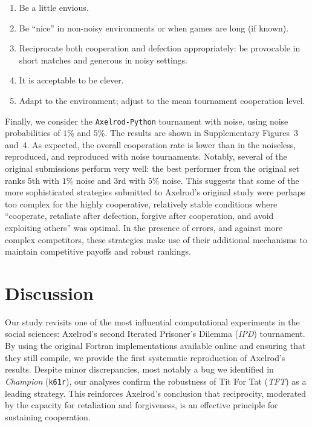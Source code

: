 \documentclass{article}
\newcommand{\TFT}{\emph{TFT}}
\newcommand{\IPD}{\emph{IPD}}
\newcommand{\AXL}{\texttt{Axelrod-Python}}
\begin{document}
\begin{enumerate}
    \item Be a little envious.
    \item Be ``nice'' in non-noisy environments or when games are long (if
    known).
    \item Reciprocate both cooperation and defection appropriately: be
    provocable in short matches and generous in noisy settings.
    \item It is acceptable to be clever.
    \item Adapt to the environment; adjust to the mean tournament cooperation
    level.
\end{enumerate}

Finally, we consider the \AXL{} tournament with noise, using noise probabilities
of \(1\%\) and \(5\%\). The results are shown in
Supplementary Figures~3 and~4. As expected, the
overall cooperation rate is lower than in the noiseless, reproduced, and
reproduced with noise tournaments. Notably, several of the original submissions
perform very well: the best performer from the original set ranks 5th with
\(1\%\) noise and 3rd with \(5\%\) noise. This suggests that some of the more
sophisticated strategies submitted to Axelrod's original study were perhaps too
complex for the highly cooperative, relatively stable conditions where
``cooperate, retaliate after defection, forgive after cooperation, and avoid
exploiting others'' was optimal. In the presence of errors, and against
more complex competitors, these strategies make use of their additional
mechanisms to maintain competitive payoffs and robust rankings.

\section*{Discussion}\label{sec:discussion}

Our study revisits one of the most influential computational experiments in the
social sciences: Axelrod's second Iterated Prisoner's Dilemma (\IPD) tournament.
By using the original Fortran implementations available online and ensuring
that they still compile, we provide the first systematic reproduction of
Axelrod's results. Despite minor discrepancies, most notably a bug we identified
in \emph{Champion} (\texttt{k61r}), our analyses confirm the robustness of Tit
For Tat (\TFT{}) as a leading strategy. This reinforces Axelrod's conclusion
that reciprocity, moderated by the capacity for retaliation and forgiveness, is
an effective principle for sustaining cooperation.
\end{document}
